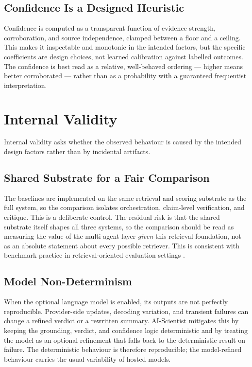 \subsection{Confidence Is a Designed Heuristic }

Confidence is computed as a transparent function of evidence strength, corroboration, and source independence,
clamped between a floor and a ceiling. This makes it inspectable and monotonic in the intended factors, but the
specific coefficients are design choices, not learned calibration against labelled outcomes. The confidence is best
read as a relative, well-behaved ordering --- higher means better corroborated --- rather than as a probability with
a guaranteed frequentist interpretation.

\section{Internal Validity }

Internal validity asks whether the observed behaviour is caused by the intended design factors rather than by
incidental artifacts.

\subsection{Shared Substrate for a Fair Comparison }

The baselines are implemented on the same retrieval and scoring substrate as the full system, so the comparison
isolates orchestration, claim-level verification, and critique. This is a deliberate control. The residual risk is
that the shared substrate itself shapes all three systems, so the comparison should be read as measuring the value
of the multi-agent layer \emph{given} this retrieval foundation, not as an absolute statement about every possible
retriever. This is consistent with benchmark practice in retrieval-oriented evaluation settings
\cite{petroni2020kilt,thakur2021beir,ragsurvey2024,min2023factscore}.

\subsection{Model Non-Determinism }

When the optional language model is enabled, its outputs are not perfectly reproducible. Provider-side updates,
decoding variation, and transient failures can change a refined verdict or a rewritten summary. AI-Scientist
mitigates this by keeping the grounding, verdict, and confidence logic deterministic and by treating the model as an
optional refinement that falls back to the deterministic result on failure. The deterministic behaviour is therefore
reproducible; the model-refined behaviour carries the usual variability of hosted models.

